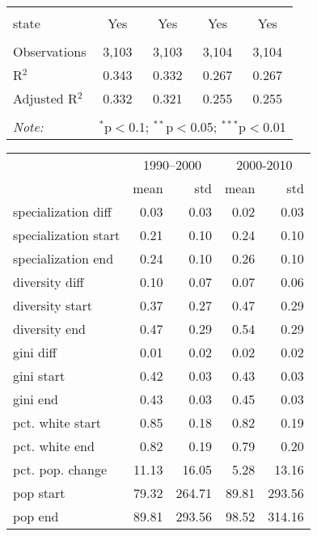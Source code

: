 \documentclass[12pt]{article}
\begin{document}
\begin{table}[p]
\begin{tabular}{@{\extracolsep{5pt}}lcccc}
\hline \\[-1.8ex] 
state & Yes & Yes & Yes & Yes \\ 
\hline \\[-1.8ex] 
Observations & 3,103 & 3,103 & 3,104 & 3,104 \\ 
R$^{2}$ & 0.343 & 0.332 & 0.267 & 0.267 \\ 
Adjusted R$^{2}$ & 0.332 & 0.321 & 0.255 & 0.255 \\ 
\hline 
\hline \\[-1.8ex] 
\textit{Note:}  & \multicolumn{4}{r}{$^{*}$p$<$0.1; $^{**}$p$<$0.05; $^{***}$p$<$0.01} \\ 
\end{tabular} 
\end{table} 




\begin{tabular}{lrrrr}
\toprule
{} & \multicolumn{2}{c}{1990--2000} & \multicolumn{2}{c}{2000-2010} \\
 \cmidrule(lr){2-3} \cmidrule(lr){4-5}
{} &  mean &  std &  mean &  std \\
\midrule
specialization diff  &      0.03 &     0.03 &      0.02 &     0.03 \\
specialization start &      0.21 &     0.10 &      0.24 &     0.10 \\
specialization end   &      0.24 &     0.10 &      0.26 &     0.10 \\
diversity diff       &      0.10 &     0.07 &      0.07 &     0.06 \\
diversity start      &      0.37 &     0.27 &      0.47 &     0.29 \\
diversity end        &      0.47 &     0.29 &      0.54 &     0.29 \\
gini diff            &      0.01 &     0.02 &      0.02 &     0.02 \\
gini start           &      0.42 &     0.03 &      0.43 &     0.03 \\
gini end             &      0.43 &     0.03 &      0.45 &     0.03 \\
pct. white start         &      0.85 &     0.18 &      0.82 &     0.19 \\
pct. white end           &      0.82 &     0.19 &      0.79 &     0.20 \\
pct. pop. change          &     11.13 &    16.05 &      5.28 &    13.16 \\
pop start            &     79.32 &   264.71 &     89.81 &   293.56 \\
pop end              &     89.81 &   293.56 &     98.52 &   314.16 \\
\bottomrule
\end{tabular}
\end{document}
